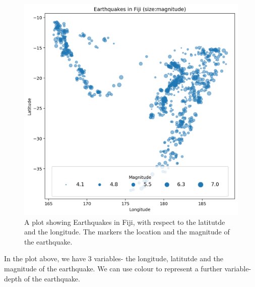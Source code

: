 \documentclass[a4paper, openany]{memoir}
\begin{document}
\begin{figure}[H]
    \centering
    \includegraphics[scale=0.4]{src/2.41 Fiji Example Plot 2.png}
    \caption{A plot showing Earthquakes in Fiji, with respect to the latitutde and the longitude. The markers the location and the magnitude of the earthquake.}
\end{figure}
In the plot above, we have 3 variables- the longitude, latitutde and the magnitude of the earthquake. We can use colour to represent a further variable- depth of the earthquake.
\end{document}
